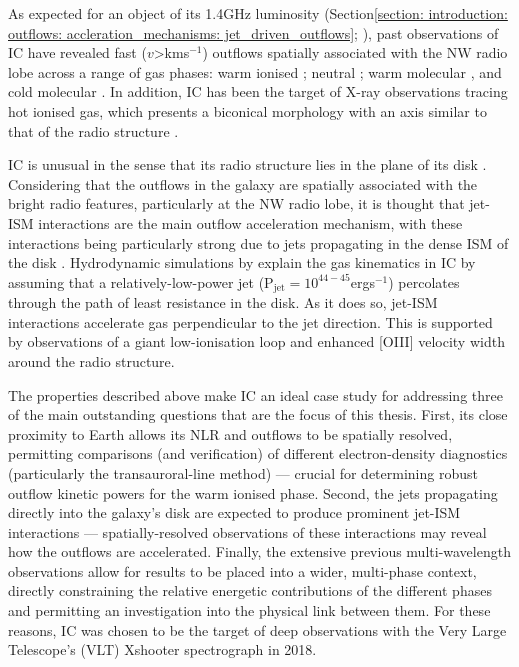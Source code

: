 As expected for an object of its 1.4\;GHz luminosity (Section\;\ref{section: introduction: outflows: accleration_mechanisms: jet_driven_outflows}; \citealt{Whittle1988, Whittle1992c, Mullaney2013}), past observations of IC have revealed fast (\mbox{$v$\;\textgreater{}\;km\;s$^{-1}$}) outflows spatially associated with the NW radio lobe across a range of gas phases: warm ionised \citep{Morganti2007, Sharp2010, Congiu2017, Venturi2021}; neutral \citep{Morganti1998, Oosterloo2000}; warm molecular \citep{Tadhunter2014}, and cold molecular \citep{Morganti2013_IC5063, Morganti2015, Dasyra2016, Oosterloo2017}. In addition, IC has been the target of X-ray observations tracing hot ionised gas, which presents a biconical morphology with an axis similar to that of the radio structure \citep{Vignali1997, Tazaki2011, Travascio2021}.

IC is unusual in the sense that its radio structure lies in the plane of its disk \citep{Morganti1998, Oosterloo2000, Morganti2015, Mukherjee2018}. Considering that the outflows in the galaxy are spatially associated with the bright radio features, particularly at the NW radio lobe, it is thought that jet-ISM interactions are the main outflow acceleration mechanism, with these interactions being particularly strong due to jets propagating in the dense ISM of the disk \citep{Tadhunter2014, Morganti2015}. Hydrodynamic simulations by \citet{Mukherjee2018} explain the gas kinematics in IC by assuming that a relatively-low-power jet (P$_\mathrm{jet}=10^{44-45}$\;erg\;s$^{-1}$) percolates through the path of least resistance in the disk. As it does so, jet-ISM interactions accelerate gas perpendicular to the jet direction. This is supported by observations of a giant low-ionisation loop \citep{Maksym2020} and enhanced [OIII] velocity width \citep{Venturi2021} around the radio structure.

The properties described above make IC an ideal case study for addressing three of the main outstanding questions that are the focus of this thesis. First, its close proximity to Earth allows its NLR and outflows to be spatially resolved, permitting comparisons (and verification) of different electron-density diagnostics (particularly the transauroral-line method) --- crucial for determining robust outflow kinetic powers for the warm ionised phase. Second, the jets propagating directly into the galaxy's disk are expected to produce prominent jet-ISM interactions --- spatially-resolved observations of these interactions may reveal how the outflows are accelerated. Finally, the extensive previous multi-wavelength observations allow for results to be placed into a wider, multi-phase context, directly constraining the relative energetic contributions of the different phases and permitting an investigation into the physical link between them. For these reasons, IC was chosen to be the target of deep observations with the Very Large Telescope's (VLT) Xshooter spectrograph in 2018.

